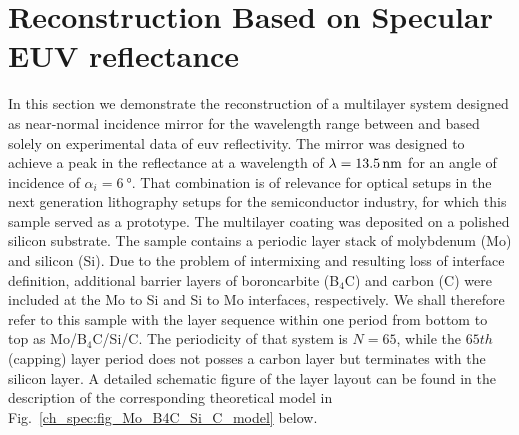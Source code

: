 % 



\section{Reconstruction Based on Specular EUV reflectance} \label{ch_spec:sec_PTB17}
\label{ch_spec:sec_reconstruction_PTB17}
In this section we demonstrate the reconstruction of a multilayer system designed as near-normal incidence mirror for the wavelength range between  and  based solely on experimental data of \gls{euv} reflectivity. The mirror was designed to achieve a peak in the reflectance at a wavelength of $\lambda=\nm{13.5}$ for an angle of incidence of $\alpha_i = \SI{6}{\degree}$. That combination is of relevance for optical setups in the next generation lithography setups for the semiconductor industry, for which this sample served as a prototype. The multilayer coating was deposited on a polished silicon substrate. The sample contains a periodic layer stack of molybdenum (Mo) and silicon (Si). Due to the problem of intermixing and resulting loss of interface definition, additional barrier layers of boroncarbite (B$_4$C) and carbon (C) were included at the Mo to Si and Si to Mo interfaces, respectively. We shall therefore refer to this sample with the layer sequence within one period from bottom to top as Mo/B$_4$C/Si/C. The periodicity of that system is $N=65$, while the $65th$ (capping) layer period does not posses a carbon layer but terminates with the silicon layer. A detailed schematic figure of the layer layout can be found in the description of the corresponding theoretical model in Fig.~\ref{ch_spec:fig_Mo_B4C_Si_C_model} below.

